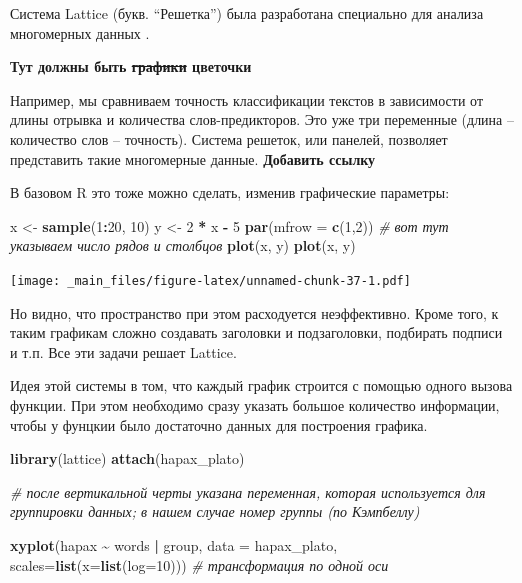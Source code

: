\documentclass[
]{book}
\newenvironment{Shaded}{\begin{snugshade}}{\end{snugshade}}
\newcommand{\AttributeTok}[1]{\textcolor[rgb]{0.13,0.29,0.53}{#1}}
\newcommand{\CommentTok}[1]{\textcolor[rgb]{0.56,0.35,0.01}{\textit{#1}}}
\newcommand{\DecValTok}[1]{\textcolor[rgb]{0.00,0.00,0.81}{#1}}
\newcommand{\FunctionTok}[1]{\textcolor[rgb]{0.13,0.29,0.53}{\textbf{#1}}}
\newcommand{\NormalTok}[1]{#1}
\newcommand{\OtherTok}[1]{\textcolor[rgb]{0.56,0.35,0.01}{#1}}
\newcommand{\SpecialCharTok}[1]{\textcolor[rgb]{0.81,0.36,0.00}{\textbf{#1}}}
\theoremstyle{definition}
\theoremstyle{definition}
\theoremstyle{definition}
\theoremstyle{definition}
\theoremstyle{remark}
\begin{document}
Система Lattice (букв. ``Решетка'') была разработана специально для анализа многомерных данных \citep{sarkar2008}.

\textbf{Тут должны быть \st{графики} цветочки}

Например, мы сравниваем точность классификации текстов в зависимости от длины отрывка и количества слов-предикторов. Это уже три переменные (длина -- количество слов -- точность). Система решеток, или панелей, позволяет представить такие многомерные данные. \textbf{Добавить ссылку}

В базовом R это тоже можно сделать, изменив графические параметры:

\begin{Shaded}
\begin{Highlighting}[]
\NormalTok{x }\OtherTok{\textless{}{-}} \FunctionTok{sample}\NormalTok{(}\DecValTok{1}\SpecialCharTok{:}\DecValTok{20}\NormalTok{, }\DecValTok{10}\NormalTok{)}
\NormalTok{y }\OtherTok{\textless{}{-}} \DecValTok{2} \SpecialCharTok{*}\NormalTok{ x  }\SpecialCharTok{{-}} \DecValTok{5}
\FunctionTok{par}\NormalTok{(}\AttributeTok{mfrow =} \FunctionTok{c}\NormalTok{(}\DecValTok{1}\NormalTok{,}\DecValTok{2}\NormalTok{)) }\CommentTok{\# вот тут указываем число рядов и столбцов}
\FunctionTok{plot}\NormalTok{(x, y)}
\FunctionTok{plot}\NormalTok{(x, y)}
\end{Highlighting}
\end{Shaded}

\texttt{[image: \_main\_files/figure-latex/unnamed-chunk-37-1.pdf]}

Но видно, что пространство при этом расходуется неэффективно. Кроме того, к таким графикам сложно создавать заголовки и подзаголовки, подбирать подписи и т.п. Все эти задачи решает Lattice.

Идея этой системы в том, что каждый график строится с помощью одного вызова функции. При этом необходимо сразу указать большое количество информации, чтобы у фунцкии было достаточно данных для построения графика.

\begin{Shaded}
\begin{Highlighting}[]
\FunctionTok{library}\NormalTok{(lattice)}
\FunctionTok{attach}\NormalTok{(hapax\_plato)}

\CommentTok{\# после вертикальной черты указана переменная, которая используется для группировки данных; в нашем случае номер группы (по Кэмпбеллу)}

\FunctionTok{xyplot}\NormalTok{(hapax }\SpecialCharTok{\textasciitilde{}}\NormalTok{ words }\SpecialCharTok{|}\NormalTok{ group, }\AttributeTok{data =}\NormalTok{ hapax\_plato,}
       \AttributeTok{scales=}\FunctionTok{list}\NormalTok{(}\AttributeTok{x=}\FunctionTok{list}\NormalTok{(}\AttributeTok{log=}\DecValTok{10}\NormalTok{))) }\CommentTok{\# трансформация по одной оси}
\end{Highlighting}
\end{Shaded}
\end{document}
